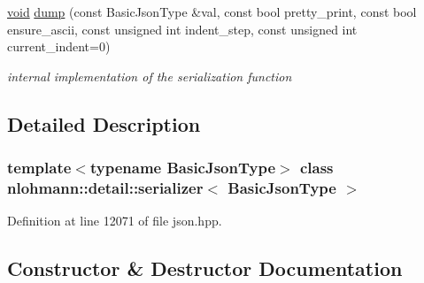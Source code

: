 \begin{DoxyCompactItemize}
\item 
\mbox{\hyperlink{namespacenlohmann_1_1detail_a59fca69799f6b9e366710cb9043aa77d}{void}} \mbox{\hyperlink{classnlohmann_1_1detail_1_1serializer_a95460ebd1a535a543e5a0ec52e00f48b}{dump}} (const Basic\+Json\+Type \&val, const bool pretty\+\_\+print, const bool ensure\+\_\+ascii, const unsigned int indent\+\_\+step, const unsigned int current\+\_\+indent=0)
\begin{DoxyCompactList}\small\item\em internal implementation of the serialization function \end{DoxyCompactList}\end{DoxyCompactItemize}


\subsection{Detailed Description}
\subsubsection*{template$<$typename Basic\+Json\+Type$>$\newline
class nlohmann\+::detail\+::serializer$<$ Basic\+Json\+Type $>$}



Definition at line 12071 of file json.\+hpp.



\subsection{Constructor \& Destructor Documentation}
\mbox{\label{classnlohmann_1_1detail_1_1serializer_ac010525281d97867ee842da37294fe83}} 
